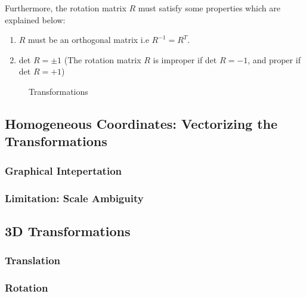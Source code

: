 \documentclass{book}
\begin{document}
\begin{enumerate}
                    Furthermore, the rotation matrix $R$ must satisfy some properties which are explained below: 
                    \begin{enumerate}
                        \item $R$ must be an orthogonal matrix i.e $R^{-1} = R^{T}$. 
                        \item det $R = \pm 1$ (The rotation matrix $R$ is improper if det $R = -1$, and proper if det $R = +1$)
                    \end{enumerate} 
                \end{enumerate}

                \begin{figure}[!ht]%
                    \centering
                    \qquad
                    \qquad
                    \caption{Transformations}%
                    \label{fig:triangulation}%
                \end{figure}

            \subsection{Homogeneous Coordinates: Vectorizing the Transformations}
                \subsubsection{Graphical Intepertation}

                \subsubsection{Limitation: Scale Ambiguity}

            \subsection{3D Transformations}
                \subsubsection{Translation}

                \subsubsection{Rotation}
\end{document}
